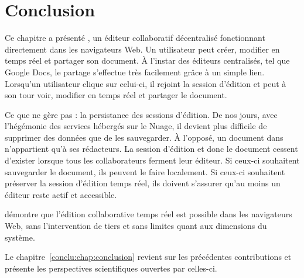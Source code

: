 
\section{Conclusion}
\label{editor:sec:conclusion}

Ce chapitre a présenté \CRATE, un éditeur collaboratif décentralisé fonctionnant
directement dans les navigateurs Web. Un utilisateur peut créer, modifier en
temps réel et partager son document. À l'instar des éditeurs centralisés, tel
que Google Docs, le partage s'effectue très facilement grâce à un simple
lien. Lorsqu'un utilisateur clique sur celui-ci, il rejoint la session d'édition
et peut à son tour voir, modifier en temps réel et partager le document.

Ce que \CRATE ne gère pas : la persistance des sessions d'édition. De nos jours,
avec l'hégémonie des services hébergés sur le Nuage, il devient plus difficile
de supprimer des données que de les sauvegarder. À l'opposé, un document dans
\CRATE n'appartient qu'à ses rédacteurs. La session d'édition et donc le
document cessent d'exister lorsque tous les collaborateurs ferment leur
éditeur. Si ceux-ci souhaitent sauvegarder le document, ils peuvent le faire
localement. Si ceux-ci souhaitent préserver la session d'édition temps réel, ils
doivent s'assurer qu'au moins un éditeur reste actif et accessible.


\CRATE démontre que l'édition collaborative temps réel est possible dans les
navigateurs Web, sans l'intervention de tiers et sans limites quant aux
dimensions du système.


Le chapitre~\ref{conclu:chap:conclusion} revient sur les précédentes
contributions et présente les perspectives scientifiques ouvertes par celles-ci.


